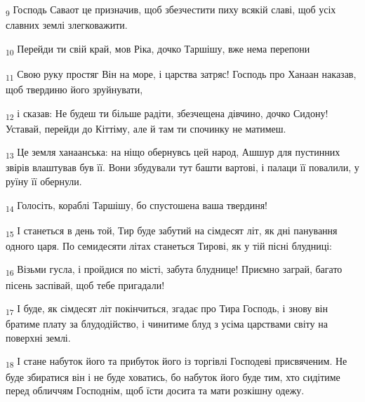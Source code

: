 \begin{tcolorbox}
\textsubscript{9} Господь Саваот це призначив, щоб збезчестити пиху всякій славі, щоб усіх славних землі злегковажити.
\end{tcolorbox}
\begin{tcolorbox}
\textsubscript{10} Перейди ти свій край, мов Ріка, дочко Таршішу, вже нема перепони
\end{tcolorbox}
\begin{tcolorbox}
\textsubscript{11} Свою руку простяг Він на море, і царства затряс! Господь про Ханаан наказав, щоб твердиню його зруйнувати,
\end{tcolorbox}
\begin{tcolorbox}
\textsubscript{12} і сказав: Не будеш ти більше радіти, збезчещена дівчино, дочко Сидону! Уставай, перейди до Кіттіму, але й там ти спочинку не матимеш.
\end{tcolorbox}
\begin{tcolorbox}
\textsubscript{13} Це земля ханаанська: на ніщо обернувсь цей народ, Ашшур для пустинних звірів влаштував був її. Вони збудували тут башти вартові, і палаци її повалили, у руїну її обернули.
\end{tcolorbox}
\begin{tcolorbox}
\textsubscript{14} Голосіть, кораблі Таршішу, бо спустошена ваша твердиня!
\end{tcolorbox}
\begin{tcolorbox}
\textsubscript{15} І станеться в день той, Тир буде забутий на сімдесят літ, як дні панування одного царя. По семидесяти літах станеться Тирові, як у тій пісні блудниці:
\end{tcolorbox}
\begin{tcolorbox}
\textsubscript{16} Візьми гусла, і пройдися по місті, забута блуднице! Приємно заграй, багато пісень заспівай, щоб тебе пригадали!
\end{tcolorbox}
\begin{tcolorbox}
\textsubscript{17} І буде, як сімдесят літ покінчиться, згадає про Тира Господь, і знову він братиме плату за блудодійство, і чинитиме блуд з усіма царствами світу на поверхні землі.
\end{tcolorbox}
\begin{tcolorbox}
\textsubscript{18} І стане набуток його та прибуток його із торгівлі Господеві присвяченим. Не буде збиратися він і не буде ховатись, бо набуток його буде тим, хто сидітиме перед обличчям Господнім, щоб їсти досита та мати розкішну одежу.
\end{tcolorbox}
